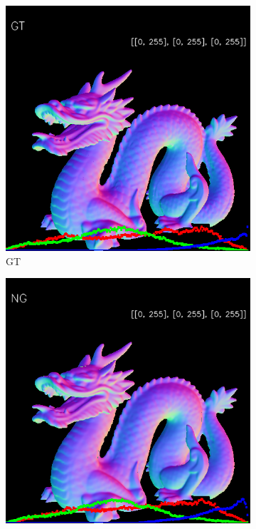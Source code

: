 \begin{figure}[h!]
	\centering
	\begin{subfigure}[b]{0.19\linewidth}
		\includegraphics[width=\linewidth]{./Figures/ng-synthetic/fancy_eval_3_groundtruth.png}
		\caption{GT}
	\end{subfigure}
	\begin{subfigure}[b]{0.19\linewidth}
		\includegraphics[width=\linewidth]{./Figures/ng-synthetic/fancy_eval_3_normal_NG.png}

\end{subfigure}
\end{figure}
